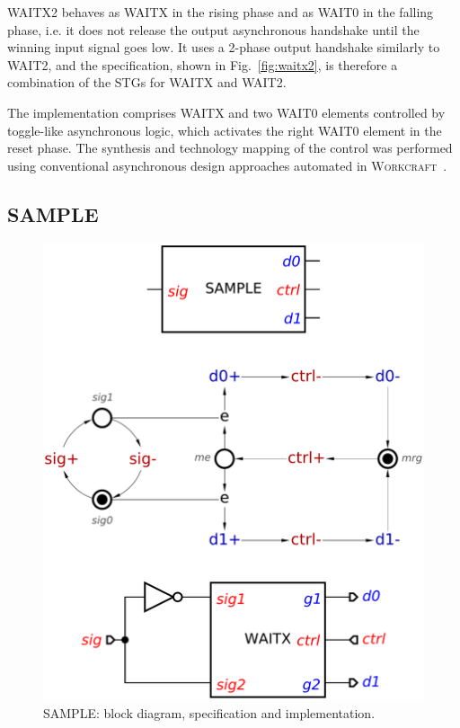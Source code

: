 \documentclass[conference]{IEEEtran}
\begin{document}
\textsf{WAITX2} behaves as \textsf{WAITX} in the rising phase and as \textsf{WAIT0}
in the falling phase, i.e. it does not release the output asynchronous handshake until
the winning input signal goes low. It uses a 2-phase output handshake similarly to
\textsf{WAIT2}, and the specification, shown in Fig.~\ref{fig:waitx2}, is therefore
a combination of the STGs for \textsf{WAITX} and \textsf{WAIT2}.

The implementation comprises \textsf{WAITX} and two \textsf{WAIT0} elements controlled
by toggle-like asynchronous logic, which activates the right \textsf{WAIT0} element in the
reset phase. The synthesis and technology mapping of the control was performed using
conventional asynchronous design approaches automated in
\textsc{Workcraft}~\cite{Workcraft_website}.

\subsection*{\textsf{SAMPLE}}
\vspace{-1mm}

\begin{figure}
\begin{center}
    \includegraphics[scale=0.23]{fig/SAMPLE.pdf}
    \caption{\textsf{SAMPLE}: block diagram, specification and implementation.}
    \label{fig:sample}
    \vspace{-6mm}
\end{center}
\end{figure}
\end{document}
